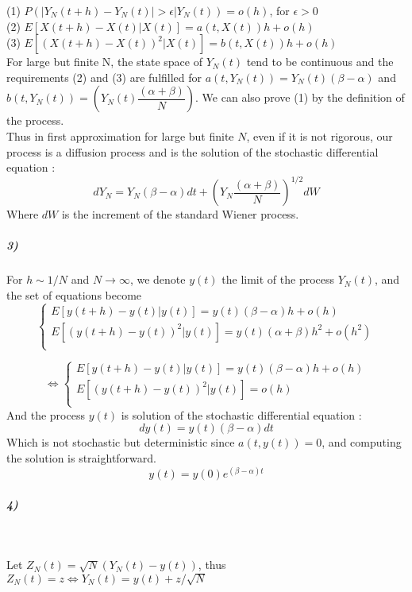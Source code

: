 \documentclass{article}
\begin{document}
(1) $P\left( |Y_N(t+h)-Y_N(t)|>\epsilon | Y_N(t)\right)=o(h)$, for $\epsilon>0$ \\

(2) $E\left[ X(t+h)-X(t) | X(t)\right]=a(t,X(t))h +o(h)$ \\

(3) $E\left[( X(t+h)-X(t))^2 | X(t)\right]=b(t,X(t))h +o(h)$\\



For large but finite N, the state space of $Y_N(t)$ tend to be continuous and the requirements (2) and (3) are fulfilled for $a(t,Y_N(t))=Y_N(t)(\beta-\alpha)$ and $b(t,Y_N(t))=\left(Y_N(t)\dfrac{(\alpha+\beta)}{N}\right)$. We can also prove (1) by the definition of the process. \\

Thus in first approximation for large but finite $N$, even if it is not rigorous, our process is a diffusion process and is the solution of the stochastic differential equation : 
$$
dY_N=Y_N(\beta-\alpha)dt +\left(Y_N\dfrac{(\alpha+\beta)}{N}\right)^{1/2}dW
$$
Where $dW$ is the increment of the standard Wiener process.

\subparagraph{3)}
For $h \sim 1/N$ and $N \rightarrow \infty $, we denote $y(t)$ the limit of the process $Y_N(t)$, and the set of equations become 
$$
\left \{
\begin{array}{l}
        E\left[ y(t+h)-y(t) | y(t)\right]=y(t)(\beta-\alpha)h +o(h) \\
		E\left[ (y(t+h)-y(t))^2 | y(t)\right]=y(t)(\alpha+\beta)h^2 +o(h^2) \\
    \end{array}
\right. 
$$

$$
\iff
\left \{
\begin{array}{l}
        E\left[ y(t+h)-y(t) | y(t)\right]=y(t)(\beta-\alpha)h +o(h) \\
		E\left[ (y(t+h)-y(t))^2 | y(t)\right]=o(h) \\
    \end{array}
\right. 
$$
And the process $y(t)$ is solution of the stochastic differential equation :
$$
dy(t)=y(t)(\beta-\alpha)dt
$$
Which is not stochastic but deterministic since $a(t,y(t))=0$, and computing the solution is straightforward.
$$y(t)=y(0)e^{(\beta-\alpha)t}$$

\subparagraph{4)}
\

Let $Z_N(t)=\sqrt{N}(Y_N(t)-y(t))$, thus $Z_N(t)=z\iff Y_N(t)=y(t)+z/\sqrt{N}$\\
\end{document}
